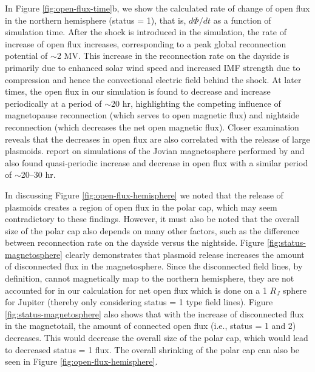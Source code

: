 In Figure \ref{fig:open-flux-time}b, we show the calculated rate of change of open flux in the northern hemisphere (status = 1), that is, $d\Phi/dt$ as a function of simulation time. After the shock is introduced in the simulation, the rate of increase of open flux increases, corresponding to a peak global reconnection potential of $\sim$2 MV. This increase in the reconnection rate on the dayside is primarily due to enhanced solar wind speed and increased IMF strength due to compression and hence the convectional electric field behind the shock. At later times, the open flux in our simulation is found to decrease and increase periodically at a period of $\sim$20 hr, highlighting the competing influence of magnetopause reconnection (which serves to open magnetic flux) and nightside reconnection (which decreases the net open magnetic flux). Closer examination reveals that the decreases in open flux are also correlated with the release of large plasmoids.  report on simulations of the Jovian magnetosphere performed by  and also found quasi‐periodic increase and decrease in open flux with a similar period of $\sim$20–30 hr. 

In discussing Figure \ref{fig:open-flux-hemisphere} we noted that the release of plasmoids creates a region of open flux in the polar cap, which may seem contradictory to these findings. However, it must also be noted that the overall size of the polar cap also depends on many other factors, such as the difference between reconnection rate on the dayside versus the nightside. Figure \ref{fig:status-magnetosphere} clearly demonstrates that plasmoid release increases the amount of disconnected flux in the magnetosphere. Since the disconnected field lines, by definition, cannot magnetically map to the northern hemisphere, they are not accounted for in our calculation for net open flux which is done on a 1 $R_J$ sphere for Jupiter (thereby only considering status = 1 type field lines). Figure \ref{fig:status-magnetosphere} also shows that with the increase of disconnected flux in the magnetotail, the amount of connected open flux (i.e., status = 1 and 2) decreases. This would decrease the overall size of the polar cap, which would lead to decreased status = 1 flux. The overall shrinking of the polar cap can also be seen in Figure \ref{fig:open-flux-hemisphere}. 

